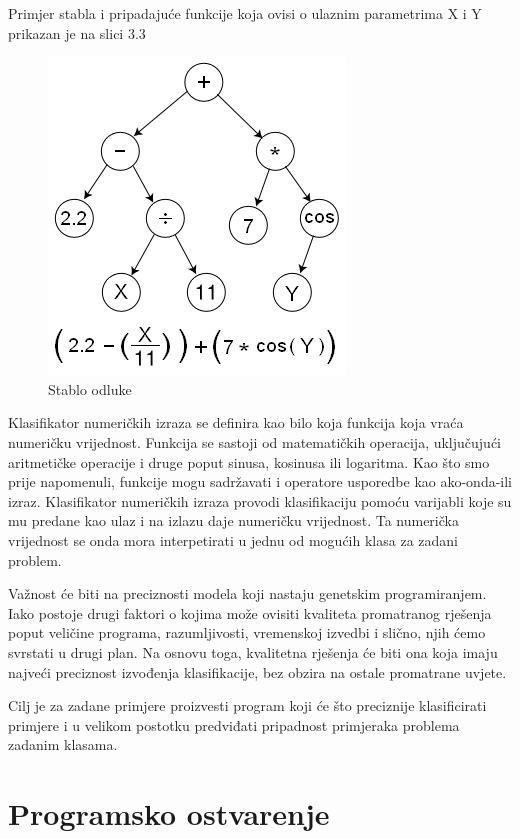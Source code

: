 \documentclass[times, utf8, zavrsni]{fer}
\begin{document}
Primjer stabla i pripadajuće funkcije koja ovisi o ulaznim parametrima X i Y prikazan je na slici 3.3

\begin{figure}[htb]
\centering
\includegraphics[scale=0.6]{images/stablo}
\caption{Stablo odluke}
\end{figure}

Klasifikator numeričkih izraza se definira kao bilo koja funkcija koja vraća numeričku vrijednost. Funkcija se sastoji od matematičkih operacija, uključujući aritmetičke operacije i druge poput sinusa, kosinusa ili logaritma. Kao što smo prije napomenuli, funkcije mogu sadržavati i operatore usporedbe kao ako-onda-ili izraz. Klasifikator numeričkih izraza provodi klasifikaciju pomoću varijabli koje su mu predane kao ulaz i na izlazu daje numeričku vrijednost. Ta numerička vrijednost se onda mora interpetirati u jednu od mogućih klasa za zadani problem.   

Važnost će biti na preciznosti modela koji nastaju genetskim programiranjem. Iako postoje drugi faktori o kojima može ovisiti kvaliteta promatranog rješenja poput veličine programa, razumljivosti, vremenskoj izvedbi i slično, njih ćemo svrstati u drugi plan. Na osnovu toga, kvalitetna rješenja će biti ona koja imaju najveći preciznost izvođenja klasifikacije, bez obzira na ostale promatrane uvjete.

Cilj je za zadane primjere proizvesti program koji će što preciznije klasificirati primjere i u velikom postotku predviđati pripadnost primjeraka problema zadanim klasama. 

\chapter{Programsko ostvarenje}
\end{document}
